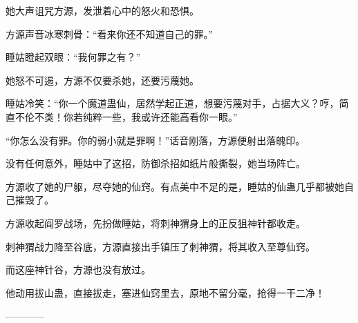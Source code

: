 \begin{this_body}
她大声诅咒方源，发泄着心中的怒火和恐惧。

方源声音冰寒刺骨：“看来你还不知道自己的罪。”

睡姑瞪起双眼：“我何罪之有？”

她怒不可遏，方源不仅要杀她，还要污蔑她。

睡姑冷笑：“你一个魔道蛊仙，居然学起正道，想要污蔑对手，占据大义？哼，简直不伦不类！你若纯粹一些，我或许还能高看你一眼。”

“你怎么没有罪。你的弱小就是罪啊！”话音刚落，方源便射出落魄印。

没有任何意外，睡姑中了这招，防御杀招如纸片般撕裂，她当场阵亡。

方源收了她的尸躯，尽夺她的仙窍。有点美中不足的是，睡姑的仙蛊几乎都被她自己摧毁了。

方源收起阎罗战场，先扮做睡姑，将刺神猬身上的正反狙神针都收走。

刺神猬战力降至谷底，方源直接出手镇压了刺神猬，将其收入至尊仙窍。

而这座神针谷，方源也没有放过。

他动用拔山蛊，直接拔走，塞进仙窍里去，原地不留分毫，抢得一干二净！

------------

\end{this_body}

